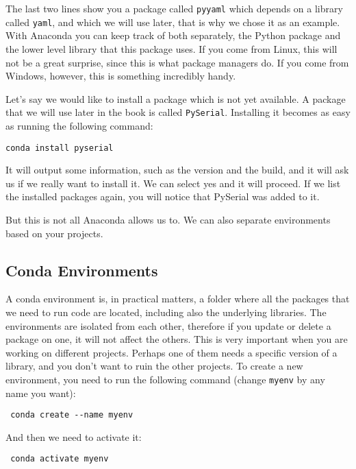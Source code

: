 The last two lines show you a package called \texttt{pyyaml} which depends on a library called \texttt{yaml}, and which we will use later, that is why we chose it as an example. With Anaconda you can keep track of both separately, the Python package and the lower level library that this package uses. If you come from Linux, this will not be a great surprise, since this is what package managers do. If you come from Windows, however, this is something incredibly handy. 

Let's say we would like to install a package which is not yet available. A package that we will use later in the book is called \texttt{PySerial}. Installing it becomes as easy as running the following command:

\begin{verbatim}
conda install pyserial
\end{verbatim}

It will output some information, such as the version and the build, and it will ask us if we really want to install it. We can select yes and it will proceed. If we list the installed packages again, you will notice that PySerial was added to it. 

But this is not all Anaconda allows us to. We can also separate environments based on your projects. 

\subsection{Conda Environments}
A conda environment is, in practical matters, a folder where all the packages that we need to run code are located, including also the underlying libraries. The environments are isolated from each other, therefore if you update or delete a package on one, it will not affect the others. This is very important when you are working on different projects. Perhaps one of them needs a specific version of a library, and you don't want to ruin the other projects. To create a new environment, you need to run the following command (change \texttt{myenv} by any name you want):

\begin{verbatim}
 conda create --name myenv
\end{verbatim}


And then we need to activate it:

\begin{verbatim}
 conda activate myenv
\end{verbatim}

